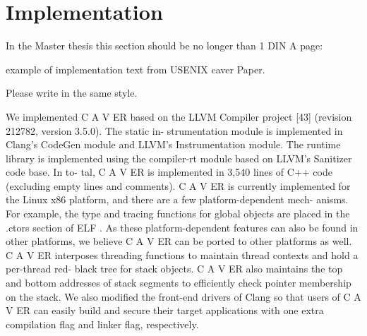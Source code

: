 \chapter{Implementation}
\label{chapter:Related_Work}


In the Master thesis this section should be no longer than 1 DIN A page:

example of implementation text from USENIX caver Paper.

Please write in the same style.


We implemented C A V ER based on the LLVM Compiler
project [43] (revision 212782, version 3.5.0). The static in-
strumentation module is implemented in Clang’s CodeGen
module and LLVM’s Instrumentation module. The
runtime library is implemented using the compiler-rt
module based on LLVM’s Sanitizer code base. In to-
tal, C A V ER is implemented in 3,540 lines of C++ code
(excluding empty lines and comments).
C A V ER is currently implemented for the Linux x86
platform, and there are a few platform-dependent mech-
anisms. For example, the type and tracing functions for
global objects are placed in the .ctors section of ELF . As
these platform-dependent features can also be found in
other platforms, we believe C A V ER can be ported to other
platforms as well. C A V ER interposes threading functions
to maintain thread contexts and hold a per-thread red-
black tree for stack objects. C A V ER also maintains the
top and bottom addresses of stack segments to efficiently
check pointer membership on the stack. We also modified
the front-end drivers of Clang so that users of C A V ER can
easily build and secure their target applications with one
extra compilation flag and linker flag, respectively.
